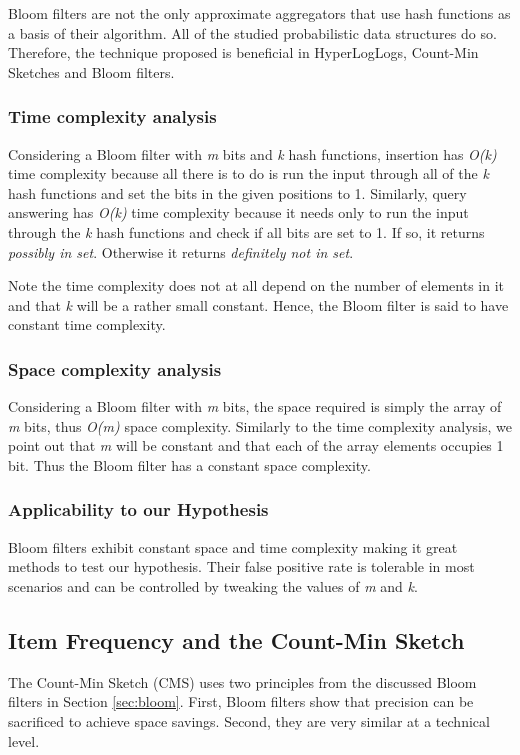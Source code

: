 Bloom filters are not the only approximate aggregators that use hash functions as a basis of their algorithm. All of the studied probabilistic data structures do so. Therefore, the technique proposed is beneficial in HyperLogLogs, Count-Min Sketches and Bloom filters.
\fi

\subsubsection*{Time complexity analysis}
Considering a Bloom filter with \textit{m} bits and \textit{k} hash functions, insertion has \textit{O(k)} time complexity because all there is to do is run the input through all of the \textit{k} hash functions and set the bits in the given positions to 1. Similarly, query answering has \textit{O(k)} time complexity because it needs only to run the input through the \textit{k} hash functions and check if all bits are set to 1. If so, it returns \textit{possibly in set}. Otherwise it returns \textit{definitely not in set}. 

Note the time complexity does not at all depend on the number of elements in it and that \textit{k} will be a rather small constant. Hence, the Bloom filter is said to have constant time complexity.

\subsubsection*{Space complexity analysis}
Considering a Bloom filter with \textit{m} bits, the space required is simply the array of \textit{m} bits, thus \textit{O(m)} space complexity. Similarly to the time complexity analysis, we point out that \textit{m} will be constant and that each of the array elements occupies 1 bit. Thus the Bloom filter has a constant space complexity.

\subsubsection*{Applicability to our Hypothesis}
Bloom filters exhibit constant space and time complexity making it great methods to test our hypothesis. Their false positive rate is tolerable in most scenarios and can be controlled by tweaking the values of \textit{m} and \textit{k}.

\subsection{Item Frequency and the Count-Min Sketch}
The Count-Min Sketch (CMS) uses two principles from the discussed Bloom filters in Section \ref{sec:bloom}. First, Bloom filters show that precision can be sacrificed to achieve space savings. Second, they are very similar at a technical level.


